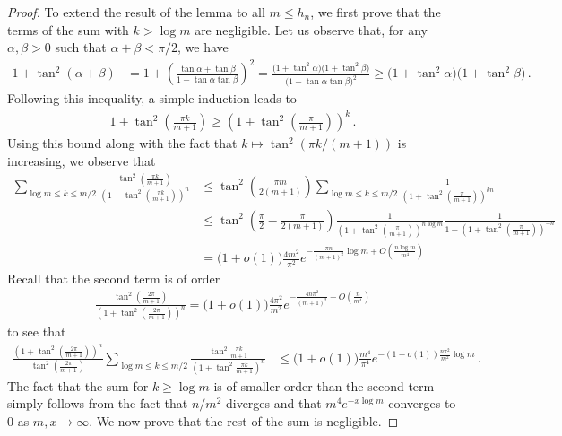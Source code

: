 \documentclass{article}
\newcommand{\1}{\mathbbm{1}}								%
\theoremstyle{definition}
\numberwithin{equation}{section}
\begin{document}
\begin{proof}
    To extend the result of the lemma to all $m\leq h_n$, we first prove that the terms of the sum with $k>\log m$ are negligible.
    Let us observe that, for any $\alpha,\beta>0$ such that $\alpha+\beta<\pi/2$, we have
    \begin{align*}
        1+\tan^2(\alpha+\beta)
        &=1+\left(\frac{\tan\alpha+\tan\beta}{1-\tan\alpha\tan\beta}\right)^2=\frac{\big(1+\tan^2\alpha\big)\big(1+\tan^2\beta\big)}{\big(1-\tan\alpha\tan\beta\big)^2}\geq\big(1+\tan^2\alpha\big)\big(1+\tan^2\beta\big)\,.
    \end{align*}
    Following this inequality, a simple induction leads to
    \begin{align*}
        1+\tan^2\left(\frac{\pi k}{m+1}\right)\geq\left(1+\tan^2\left(\frac{\pi}{m+1}\right)\right)^k\,.
    \end{align*}
    Using this bound along with the fact that $k\mapsto\tan^2(\pi k/(m+1))$ is increasing, we observe that
    \begin{align*}
        \sum_{\log m\leq k\leq m/2}\frac{\tan^2\left(\frac{\pi k}{m+1}\right)}{\left(1+\tan^2\left(\frac{\pi k}{m+1}\right)\right)^n}&\leq\tan^2\left(\frac{\pi m}{2(m+1)}\right)\sum_{\log m\leq k\leq m/2}\frac{1}{\left(1+\tan^2\left(\frac{\pi}{m+1}\right)\right)^{kn}}\\
        &\leq\tan^2\left(\frac{\pi}{2}-\frac{\pi}{2(m+1)}\right)\frac{1}{\left(1+\tan^2\left(\frac{\pi}{m+1}\right)\right)^{n\log m}}\frac{1}{1-\left(1+\tan^2\left(\frac{\pi}{m+1}\right)\right)^{-n}}\\
        &=\big(1+o(1)\big)\frac{4m^2}{\pi^2}e^{-\frac{\pi n}{(m+1)^2}\log m+O\left(\frac{n\log m}{m^4}\right)}
    \end{align*}
    Recall that the second term is of order
    \begin{align*}
        \frac{\tan^2\left(\frac{2\pi}{m+1}\right)}{\left(1+\tan^2\left(\frac{2\pi}{m+1}\right)\right)^n}=\big(1+o(1)\big)\frac{4\pi^2}{m^2}e^{-\frac{4n\pi^2}{(m+1)^2}+O\left(\frac{n}{m^4}\right)}
    \end{align*}
    to see that
    \begin{align*}
        \frac{\left(1+\tan^2\left(\frac{2\pi}{m+1}\right)\right)^n}{\tan^2\left(\frac{2\pi}{m+1}\right)}\sum_{\log m\leq k\leq m/2}\frac{\tan^2\frac{\pi k}{m+1}}{\left(1+\tan^2\frac{\pi k}{m+1}\right)^n}&\leq\big(1+o(1)\big)\frac{m^4}{\pi^4}e^{-(1+o(1))\frac{n\pi^2}{m^2}\log m}\,.
    \end{align*}
    The fact that the sum for $k\geq\log m$ is of smaller order than the second term simply follows from the fact that $n/m^2$ diverges and that $m^4e^{-x\log m}$ converges to $0$ as $m,x\rightarrow\infty$.
    We now prove that the rest of the sum is negligible.


\end{proof}
\end{document}
